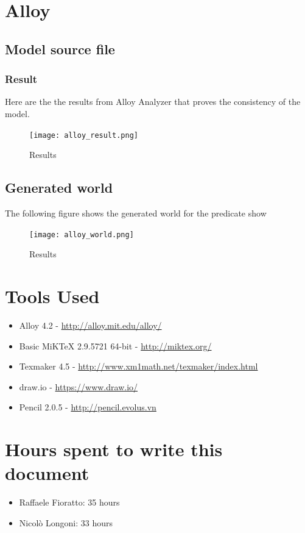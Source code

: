 \documentclass[a4paper,12pt,dvipsnames]{article}%
\begin{document}
\section{Alloy}
\subsection{Model source file}

\break
\subsubsection{Result}
Here are the the results from Alloy Analyzer that proves the consistency of the model.
\begin{figure}[H]
\centering
\texttt{[image: alloy\_result.png]}
\caption{Results}
\end{figure}
\break
\begin{landscape}
\subsection{Generated world}
The following figure shows the generated world for the predicate show
\begin{figure}[H]
\centering
\texttt{[image: alloy\_world.png]}
\caption{Results}
\end{figure}
\end{landscape}
\break
\newpage
\section*{Tools Used}
\begin{itemize}
\item Alloy 4.2 - \url{http://alloy.mit.edu/alloy/}
\item Basic MiKTeX 2.9.5721 64-bit - \url{http://miktex.org/}
\item Texmaker 4.5 - \url{http://www.xm1math.net/texmaker/index.html}
\item draw.io - \url{https://www.draw.io/}
\item Pencil 2.0.5 - \url{http://pencil.evolus.vn}
\end{itemize}
\section*{Hours spent to write this document}
\begin{itemize}
\item Raffaele Fioratto: 35 hours
\item Nicol\`{o} Longoni: 33 hours
\end{itemize}
\end{document}
